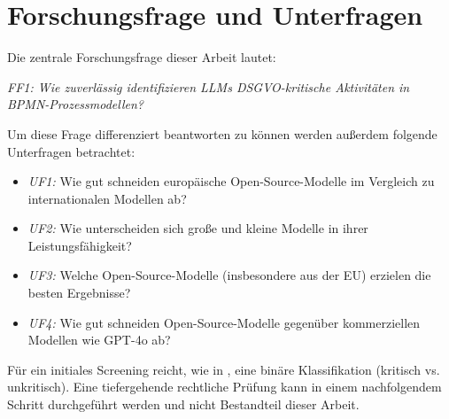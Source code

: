 \section{Forschungsfrage und Unterfragen}\label{sec:forschungsfrage-und-unterfragen}

Die zentrale Forschungsfrage dieser Arbeit lautet:

\emph{FF1: Wie zuverlässig identifizieren \acp{LLM} \ac{DSGVO}-kritische Aktivitäten in \ac{BPMN}-Prozessmodellen?}

Um diese Frage differenziert beantworten zu können werden außerdem folgende Unterfragen betrachtet:

\begin{itemize}
    \item \emph{UF1:} Wie gut schneiden europäische Open-Source-Modelle im Vergleich zu internationalen Modellen ab?
    \item \emph{UF2:} Wie unterscheiden sich große und kleine Modelle in ihrer Leistungsfähigkeit?
    \item \emph{UF3:} Welche Open-Source-Modelle (insbesondere aus der EU) erzielen die besten Ergebnisse?
    \item \emph{UF4:} Wie gut schneiden Open-Source-Modelle gegenüber kommerziellen Modellen wie GPT-4o ab?
\end{itemize}

Für ein initiales Screening reicht, wie in \cite{nake2023towards}, eine binäre Klassifikation (kritisch vs. unkritisch). Eine tiefergehende rechtliche Prüfung kann in einem nachfolgendem Schritt durchgeführt werden und nicht Bestandteil dieser Arbeit.